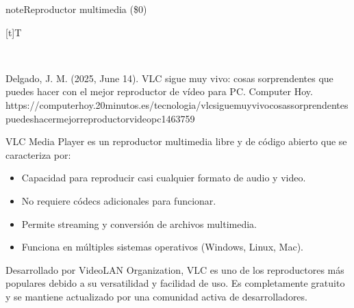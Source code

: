 \documentclass[letterpaper,10pt,spanish]{sphinxmanual}
\let\sphinxpxdimen\pdfpxdimen\else\newdimen\sphinxpxdimen
\begin{document}
\begin{sphinxadmonition}{note}{Reproductor multimedia  (\$0)}


\begin{savenotes}\sphinxattablestart
\sphinxthistablewithglobalstyle
\centering
\begin{tabulary}{\linewidth}[t]{T}
\sphinxtoprule
\sphinxtableatstartofbodyhook

\begin{sphinxfigure-in-table}
\centering
\capstart
\noindent\sphinxincludegraphics[width=400\sphinxpxdimen]{{image053}.png}
\label{\detokenize{1_guias/10ofimatica/G1012:id45}}\end{sphinxfigure-in-table}\relax
\\
\sphinxbottomrule
\end{tabulary}
\sphinxtableafterendhook\par
\sphinxattableend\end{savenotes}

\sphinxAtStartPar
%
\begin{footnote}[7]\sphinxAtStartFootnote
Delgado, J. M. (2025, June 14). VLC sigue muy vivo: cosas sorprendentes que puedes hacer con el mejor reproductor de vídeo para PC. Computer Hoy. https://computerhoy.20minutos.es/tecnologia/vlc\sphinxhyphen{}sigue\sphinxhyphen{}muy\sphinxhyphen{}vivo\sphinxhyphen{}cosas\sphinxhyphen{}sorprendentes\sphinxhyphen{}puedes\sphinxhyphen{}hacer\sphinxhyphen{}mejor\sphinxhyphen{}reproductor\sphinxhyphen{}video\sphinxhyphen{}pc\sphinxhyphen{}1463759
%
\end{footnote} VLC Media Player es un reproductor multimedia libre y de código abierto que se caracteriza por:
\begin{itemize}
\item {} 
\sphinxAtStartPar
Capacidad para reproducir casi cualquier formato de audio y video.

\item {} 
\sphinxAtStartPar
No requiere códecs adicionales para funcionar.

\item {} 
\sphinxAtStartPar
Permite streaming y conversión de archivos multimedia.

\item {} 
\sphinxAtStartPar
Funciona en múltiples sistemas operativos (Windows, Linux, Mac).

\end{itemize}

\sphinxAtStartPar
Desarrollado por VideoLAN Organization, VLC es uno de los reproductores más populares debido a su versatilidad y facilidad de uso. Es completamente gratuito y se mantiene actualizado por una comunidad activa de desarrolladores.
\end{sphinxadmonition}
\end{document}
